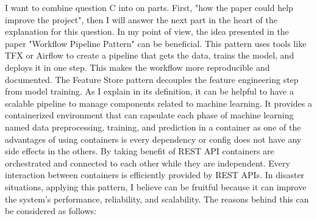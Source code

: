 \documentclass{article}
\begin{document}
I want to combine question C into on parts. First, "how the paper could help improve the project", then I will answer the next part in the heart of the explanation for this question. In my point of view, the idea presented in the paper "Workflow Pipeline Pattern" can be beneficial. This pattern uses tools like TFX or Airflow to create a pipeline that gets the data, trains the model, and deploys it in one step. This makes the workflow more reproducible and documented. The Feature Store pattern decouples the feature engineering step from model training. As I explain in its definition, it can be helpful to have a scalable pipeline to manage components related to machine learning. It provides a containerized environment that can capsulate each phase of machine learning named data preprocessing, training, and prediction in a container as one of the advantages of using containers is every dependency or config does not have any side effects in the others. By taking benefit of REST API containers are orchestrated and connected to each other while they are independent. Every interaction between containers is efficiently provided by REST APIs. In disaster situations, applying this pattern, I believe can be fruitful because it can improve the system's performance, reliability, and scalability. The reasons behind this can be considered as follows: 
\end{document}
